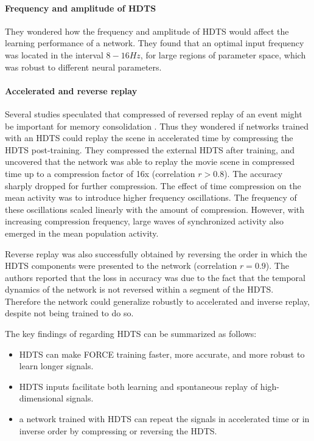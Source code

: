 \documentclass[10pt,a4paper, final]{report} %
\begin{document}
\paragraph{Frequency and amplitude of HDTS}
They wondered how the frequency and amplitude of HDTS would affect the learning performance of a network. They found that an optimal input frequency was located in the interval $8-16 Hz$, for large regions of parameter space, which was robust to different neural parameters.

\paragraph{Accelerated and reverse replay}
Several studies speculated that compressed of reversed replay of an event might be important for memory consolidation . Thus they wondered if networks trained with an HDTS could replay the scene in accelerated time by compressing the HDTS post-training. They compressed the external HDTS after training, and uncovered that the network was able to replay the movie scene in compressed time up to a compression factor of 16x (correlation $r > 0.8$). The accuracy sharply dropped for further compression.
The effect of time compression on the mean activity was to introduce higher frequency oscillations. The frequency of these oscillations scaled linearly with the amount of compression. However, with increasing compression frequency, large waves of synchronized activity also emerged in the mean population activity.

Reverse replay was also successfully obtained by reversing the order in which the HDTS components were presented to the network (correlation $r=0.9$). The authors reported that the loss in accuracy was due to the fact that the temporal dynamics of the network is not reversed within a segment of the HDTS. Therefore the network could generalize robustly to accelerated and inverse replay, despite not being trained to do so.

The key findings of \cite{nicola2017supervised} regarding HDTS can be summarized as follows:

\begin{itemize}
\item HDTS can make FORCE training faster, more accurate, and more robust to learn longer signals.
\item HDTS inputs facilitate both learning and spontaneous replay of high-dimensional signals.
\item a network trained with HDTS can repeat the signals in accelerated time or in inverse order by compressing or reversing the HDTS.
\end{itemize}
\end{document}

